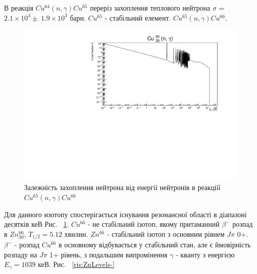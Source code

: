 \documentclass[a4paper, 14pt]{article}
\numberwithin{equation}{section}
\numberwithin{table}{section}
\begin{document}
	В реакція $Cu^{64}(n, \gamma)Cu^{65}$ переріз захоплення теплового нейтрона $\sigma$ = $2.1 \times 10^3 \pm \ 1.9 \times 10^3$ барн. $Cu^{65}$ - стабільний елемент. $Cu^{65}(n,\gamma)Cu^{66}$.
	\begin{figure}[hbt!]
		\centering \includegraphics[width=1\textwidth]{sigma/Cu65Sigma.pdf}
		\caption{Залежність захоплення нейтрона від енергії нейтронів в реакціїї  $Cu^{65}(n,\gamma)Cu^{66}$} 
		\label{ris:CuSigma}	
	\end{figure} 
	Для данного изотопу спостерігається існування резонансної області в діапазоні десятків кеВ Рис. ~\ref{ris:CuSigma}. 
	$Cu^{66}$ - не стабільний ізотоп, якому притаманний $\beta^-$ розпад в $Zn^{66}_{30}$, $T_{1/2} = 5.12$ хвилин. 
	$Zn^{66}$ - стабільний ізотоп з основним рівнем $J\pi$ 0+. $\beta^-$ - розпад $Cu^{66}$ в основному відбувається у стабільний стан, але є ймовірність розпаду на $J\pi$ 1+ рівень, з подальшим випромінення $\gamma$ - кванту з енергією $E_{\gamma} = 1039$ кеВ. Рис. ~\ref{ris:ZnLevels-}
	\\
\end{document}

